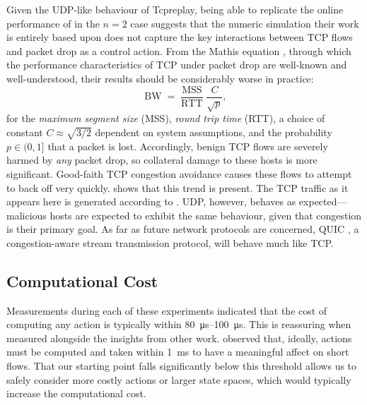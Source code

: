\documentclass[conference, letterpaper, 10pt, times]{IEEEtran}
\begin{document}
Given the UDP-like behaviour of Tcpreplay, being able to replicate the online performance of \citeauthor{DBLP:journals/eaai/MalialisK15} in the $n=2$ case suggests that the numeric simulation their work is entirely based upon does not capture the key interactions between TCP flows and packet drop as a control action.
From the Mathis equation \cite{DBLP:journals/ccr/MathisSMO97}, through which the performance characteristics of TCP under packet drop are well-known and well-understood, their results should be considerably worse in practice:
\begin{equation}
\operatorname{BW} = \frac{\operatorname{MSS}}{\operatorname{RTT}} \frac{C}{\sqrt{p}},
\end{equation}
for the \emph{maximum segment size} (MSS), \emph{round trip time} (RTT), a choice of constant $C \approx{} \sqrt{3/2}$ dependent on system assumptions, and the probability $p \in (0, 1]$ that a packet is lost.
Accordingly, benign TCP flows are severely harmed by \emph{any} packet drop, so collateral damage to these hosts is more significant.
Good-faith TCP congestion avoidance causes these flows to attempt to back off very quickly.
 shows that this trend is present.
The TCP traffic as it appears here is generated according to .
UDP, however, behaves as expected---malicious hosts are expected to exhibit the same behaviour, given that congestion is their primary goal.
As far as future network protocols are concerned, QUIC \cite{DBLP:conf/sigcomm/LangleyRWVKZYKS17}, a congestion-aware stream transmission protocol, will behave much like TCP.

\subsection{Computational Cost}

Measurements during each of these experiments indicated that the cost of computing any action is typically within \SIrange{80}{100}{\micro\second}.
This is reassuring when measured alongside the insights from other work.
\textcite{DBLP:conf/sigcomm/ChenL0L18} observed that, ideally, actions must be computed and taken within \SI{1}{\milli\second} to have a meaningful affect on short flows.
That our starting point falls significantly below this threshold allows us to safely consider more costly actions or larger state spaces, which would typically increase the computational cost.
\end{document}
